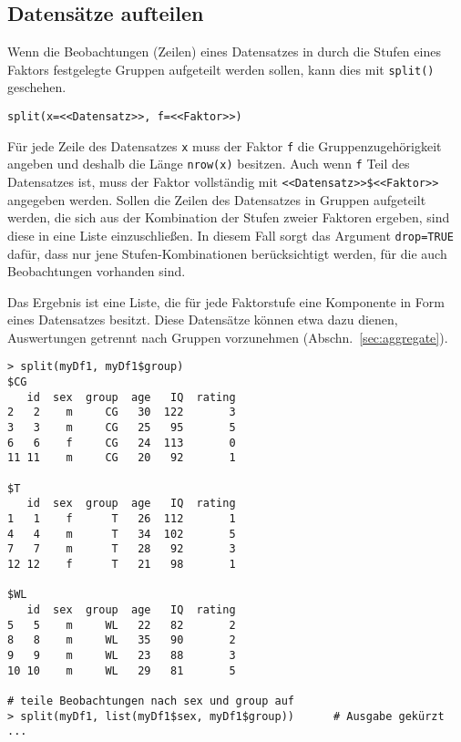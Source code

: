 \subsection{Datensätze aufteilen}
\label{sec:split}

Wenn die Beobachtungen (Zeilen) eines Datensatzes in durch die Stufen eines Faktors festgelegte Gruppen aufgeteilt werden sollen, kann dies mit \lstinline!split()! geschehen.
\begin{lstlisting}
split(x=<<Datensatz>>, f=<<Faktor>>)
\end{lstlisting}

Für jede Zeile des Datensatzes \lstinline!x! muss der Faktor \lstinline!f! die Gruppenzugehörigkeit angeben und deshalb die Länge \lstinline!nrow(x)! besitzen. Auch wenn \lstinline!f! Teil des Datensatzes ist, muss der Faktor vollständig mit \lstinline!<<Datensatz>>$<<Faktor>>! angegeben werden. Sollen die Zeilen des Datensatzes in Gruppen aufgeteilt werden, die sich aus der Kombination der Stufen zweier Faktoren ergeben, sind diese in eine Liste einzuschließen. In diesem Fall sorgt das Argument \lstinline!drop=TRUE! dafür, dass nur jene Stufen-Kombinationen berücksichtigt werden, für die auch Beobachtungen vorhanden sind.

Das Ergebnis ist eine Liste, die für jede Faktorstufe eine Komponente in Form eines Datensatzes besitzt. Diese Datensätze können etwa dazu dienen, Auswertungen getrennt nach Gruppen vorzunehmen (Abschn.\ \ref{sec:aggregate}).
\begin{lstlisting}
> split(myDf1, myDf1$group)
$CG
   id  sex  group  age   IQ  rating
2   2    m     CG   30  122       3
3   3    m     CG   25   95       5
6   6    f     CG   24  113       0
11 11    m     CG   20   92       1

$T
   id  sex  group  age   IQ  rating
1   1    f      T   26  112       1
4   4    m      T   34  102       5
7   7    m      T   28   92       3
12 12    f      T   21   98       1

$WL
   id  sex  group  age   IQ  rating
5   5    m     WL   22   82       2
8   8    m     WL   35   90       2
9   9    m     WL   23   88       3
10 10    m     WL   29   81       5

# teile Beobachtungen nach sex und group auf
> split(myDf1, list(myDf1$sex, myDf1$group))      # Ausgabe gekürzt ...
\end{lstlisting}

